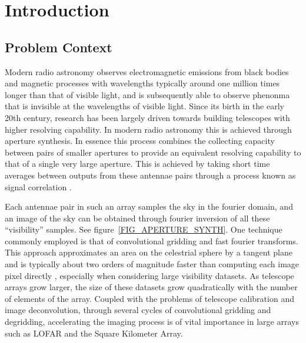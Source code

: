 \documentclass[a4paper, two column]{article}
\begin{document}
\saythanks
\section{Introduction}
\subsection{Problem Context}
Modern radio astronomy observes electromagnetic emissions from black bodies and magnetic processes with wavelengths typically around one million times longer than that of visible light, and is subsequently 
able to observe phenonma that is invisible at the wavelengths of visible light. Since its birth in the early 20th century, research has been largely driven towards building telescopes with higher resolving capability. 
In modern radio astronomy this is achieved through aperture synthesis. In essence this process combines the collecting capacity between pairs of smaller apertures to provide an equivalent
resolving capability to that of a single very large aperture. This is achieved by taking short time averages between outputs from these antennae pairs through a process known as signal correlation \cite{christiansenradiotelescopes}. 

Each antennae pair in such an array samples the sky in the fourier domain, and an image of the sky can be obtained through fourier inversion of all these ``visibility'' samples. See figure~\ref{FIG_APERTURE_SYNTH}. One technique commonly employed is that of convolutional gridding and 
fast fourier transforms. This approach approximates an area on the celestrial sphere by a tangent plane and is typically about two orders of magnitude faster than computing each image pixel directly \cite[Lecture 7]{taylor1999synthesis}, especially when 
considering large visibility datasets. As telescope arrays grow larger, the size of these datasets grow quadratically with the number of elements of the array. Coupled with the problems of telescope calibration and image deconvolution, through several cycles of 
convolutional gridding and degridding, accelerating the imaging process is of vital importance in large arrays such as LOFAR and the Square Kilometer Array.
\end{document}
